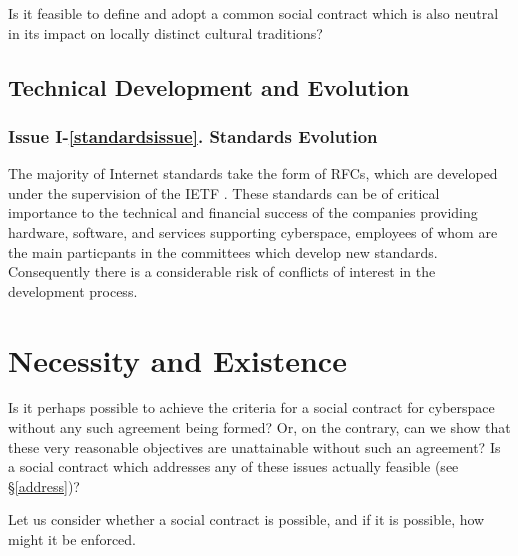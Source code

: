 Is it feasible to define and adopt a common social contract which is also neutral in its
impact on locally distinct cultural traditions?

\subsection{Technical Development and Evolution}\label{evolution}

\subsubsection*{Issue I-\ref{standardsissue}. {Standards Evolution}}\label{standardssol}
%
The majority of Internet standards take the form of RFCs, \cite{RFCs}
which are developed under the supervision of the IETF \cite{ietf}.
These standards can be of critical importance to the technical and
financial success of the companies providing hardware, software, and
services supporting cyberspace, employees of whom are the main particpants
in the committees which develop new standards. Consequently there is a considerable
risk of conflicts of interest in the development process.


\section{Necessity and Existence}\label{necessity}

Is it perhaps possible to achieve the criteria for a social contract for cyberspace
without any such agreement being formed? Or, on the contrary, can we show that
these very reasonable objectives are unattainable without such an agreement?
Is a social contract which addresses any of these issues actually feasible
(see \S\ref{address})?

Let us consider whether a social contract is possible, 
and if it is possible, how might it be enforced.

